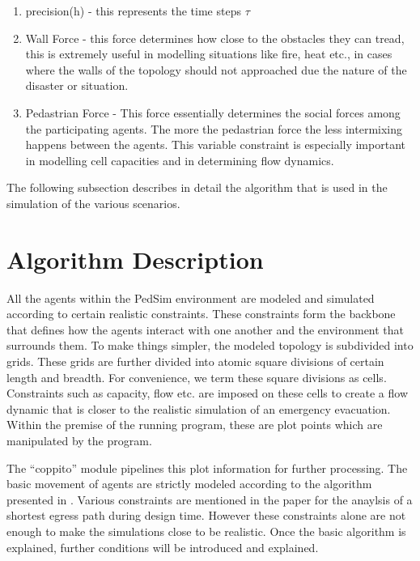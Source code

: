 \begin{enumerate}
  \item precision(h) - this represents the time steps $\tau$
  \item Wall Force - this force determines how close to the obstacles they can tread, this is extremely useful in modelling situations like fire, heat etc., in cases where the walls of the topology should not approached due the nature of the disaster or situation.
  \item Pedastrian Force - This force essentially determines the social forces among the participating agents. The more the pedastrian force the less intermixing happens between the agents. This variable constraint is especially important in modelling cell capacities and in determining flow dynamics. 
\end{enumerate}

The following subsection describes in detail the algorithm that is used in the simulation of the various scenarios. 


\section{Algorithm Description}
\label{sec: Algorithm Description}

All the agents within the PedSim environment are modeled and simulated according to certain realistic constraints. These constraints form the backbone that defines how the agents interact with one another and the environment that surrounds them. To make things simpler, the modeled topology is subdivided into grids. These grids are further divided into atomic square divisions of certain length and breadth. For convenience, we term these square divisions as cells. Constraints such as capacity, flow etc. are imposed on these cells to create a flow dynamic that is closer to the realistic simulation of an emergency evacuation. Within the premise of the running program, these are plot points which are manipulated by the program. 

The “coppito” module pipelines this plot information for further processing. The basic movement of agents are strictly modeled according to the algorithm presented in \cite{ref5}. Various constraints are mentioned in the paper for the anaylsis of a shortest egress path during design time. However these constraints alone are not enough to make the simulations close to be realistic. Once the basic algorithm is explained, further conditions will be introduced and explained. 

